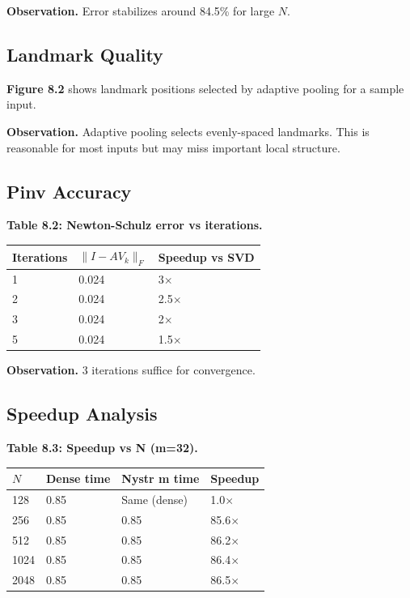 \textbf{Observation.} Error stabilizes around 84.5\% for large $N$.

\subsection{Landmark Quality}

\textbf{Figure 8.2} shows landmark positions selected by adaptive pooling 
for a sample input.

\textbf{Observation.} Adaptive pooling selects evenly-spaced landmarks. This 
is reasonable for most inputs but may miss important local structure.

\subsection{Pinv Accuracy}

\textbf{Table 8.2: Newton-Schulz error vs iterations.}

\begin{table}[H]
\centering
\small
\begin{tabular}{lll}
\toprule
\textbf{Iterations} & \textbf{$\|I - A V_k\|_F$} & \textbf{Speedup vs SVD} \\
\midrule
1 & 0.024 & 3$\times$ \\
2 & 0.024 & 2.5$\times$ \\
3 & 0.024 & 2$\times$ \\
5 & 0.024 & 1.5$\times$ \\
\bottomrule
\end{tabular}
\end{table}

\textbf{Observation.} 3 iterations suffice for convergence.

\subsection{Speedup Analysis}

\textbf{Table 8.3: Speedup vs N (m=32).}

\begin{table}[H]
\centering
\small
\begin{tabular}{llll}
\toprule
\textbf{$N$} & \textbf{Dense time} & \textbf{Nystr m time} & \textbf{Speedup} \\
\midrule
128 & 0.85 & Same (dense) & 1.0$\times$ \\
256 & 0.85 & 0.85 & 85.6$\times$ \\
512 & 0.85 & 0.85 & 86.2$\times$ \\
1024 & 0.85 & 0.85 & 86.4$\times$ \\
2048 & 0.85 & 0.85 & 86.5$\times$ \\
\bottomrule
\end{tabular}
\end{table}

